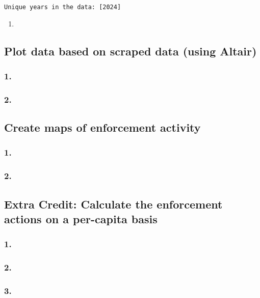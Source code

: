 \documentclass[
  letterpaper,
  DIV=11,
  numbers=noendperiod]{scrartcl}
\providecommand{\tightlist}{%
  \setlength{\itemsep}{0pt}\setlength{\parskip}{0pt}}\usepackage{longtable,booktabs,array}
\begin{document}
\begin{verbatim}
Unique years in the data: [2024]
\end{verbatim}

\begin{enumerate}
\def\labelenumi{\alph{enumi}.}
\setcounter{enumi}{2}
\tightlist
\item
\end{enumerate}

\subsection{Plot data based on scraped data (using
Altair)}\label{plot-data-based-on-scraped-data-using-altair}

\subsubsection{1.}\label{section-3}

\subsubsection{2.}\label{section-4}

\subsection{Create maps of enforcement
activity}\label{create-maps-of-enforcement-activity}

\subsubsection{1.}\label{section-5}

\subsubsection{2.}\label{section-6}

\subsection{Extra Credit: Calculate the enforcement actions on a
per-capita
basis}\label{extra-credit-calculate-the-enforcement-actions-on-a-per-capita-basis}

\subsubsection{1.}\label{section-7}

\subsubsection{2.}\label{section-8}

\subsubsection{3.}\label{section-9}
\end{document}

